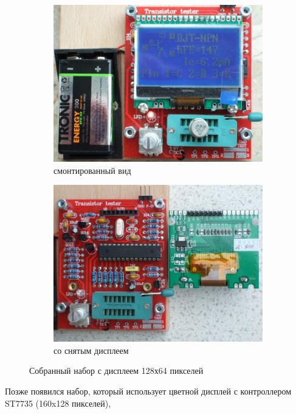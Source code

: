 \begin{figure}[H]
  \begin{subfigure}[b]{.5\textwidth}
    \centering
    \includegraphics[width=1.\textwidth]{../PNG/Kit_ST7565a.jpg}
    \caption{смонтированный вид}
  \end{subfigure}
  \begin{subfigure}[b]{.5\textwidth}
    \centering
    \includegraphics[width=1.\textwidth]{../PNG/Kit_ST7565b.jpg}
    \caption{со снятым дисплеем}
  \end{subfigure}
  \caption{Собранный набор с дисплеем 128х64 пикселей}
  \label{fig:Kit_mono}
\end{figure}
Позже появился набор, который использует цветной дисплей с контроллером ST7735 (160x128 пикселей), 
